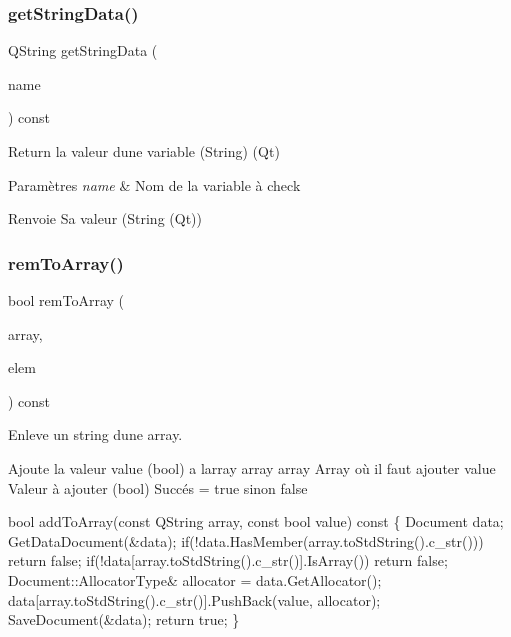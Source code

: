 \subsubsection{\texorpdfstring{get\+String\+Data()}{getStringData()}}
{\footnotesize\ttfamily Q\+String get\+String\+Data (\begin{DoxyParamCaption}\item[{const Q\+String}]{name }\end{DoxyParamCaption}) const\hspace{0.3cm}{\ttfamily [inline]}}



Return la valeur d\textquotesingle{}une variable (String) (Qt) 


\begin{DoxyParams}{Paramètres}
{\em name} & Nom de la variable à check \\
\hline
\end{DoxyParams}
\begin{DoxyReturn}{Renvoie}
Sa valeur (String (Qt)) 
\end{DoxyReturn}
\mbox{\label{classDataManager_a81de7a40c5c5184c57de175d38d20ec6}} 
\subsubsection{\texorpdfstring{rem\+To\+Array()}{remToArray()}\hspace{0.1cm}{\footnotesize\ttfamily [1/2]}}
{\footnotesize\ttfamily bool rem\+To\+Array (\begin{DoxyParamCaption}\item[{const Q\+String}]{array,  }\item[{const Q\+String}]{elem }\end{DoxyParamCaption}) const\hspace{0.3cm}{\ttfamily [inline]}}



Enleve un string d\textquotesingle{}une array. 

Ajoute la valeur value (bool) a l\textquotesingle{}array array  array Array où il faut ajouter  value Valeur à ajouter (bool)  Succés = true sinon false

bool add\+To\+Array(const Q\+String array, const bool value) const \{ Document data; Get\+Data\+Document(\&data); if(!data.Has\+Member(array.\+to\+Std\+String().c\+\_\+str())) return false; if(!data\mbox{[}array.\+to\+Std\+String().c\+\_\+str()\mbox{]}.Is\+Array()) return false; Document\+::\+Allocator\+Type\& allocator = data.\+Get\+Allocator(); data\mbox{[}array.\+to\+Std\+String().c\+\_\+str()\mbox{]}.Push\+Back(value, allocator); Save\+Document(\&data); return true; \}


